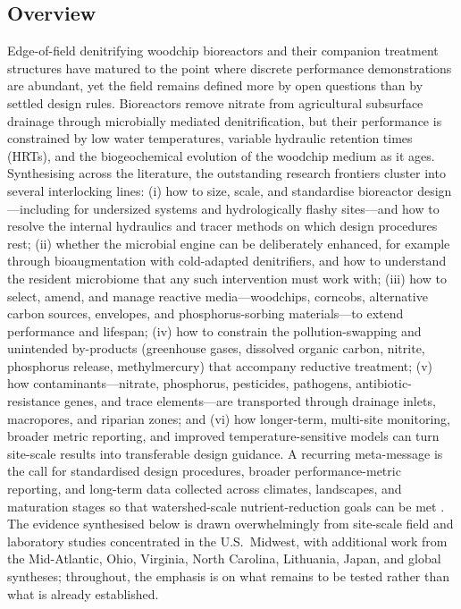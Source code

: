 \subsection{Overview}
Edge-of-field denitrifying woodchip bioreactors and their companion treatment structures have matured to the point where discrete performance demonstrations are abundant, yet the field remains defined more by open questions than by settled design rules. Bioreactors remove nitrate from agricultural subsurface drainage through microbially mediated denitrification, but their performance is constrained by low water temperatures, variable hydraulic retention times (HRTs), and the biogeochemical evolution of the woodchip medium as it ages. Synthesising across the literature, the outstanding research frontiers cluster into several interlocking lines: (i) how to size, scale, and standardise bioreactor design---including for undersized systems and hydrologically flashy sites---and how to resolve the internal hydraulics and tracer methods on which design procedures rest; (ii) whether the microbial engine can be deliberately enhanced, for example through bioaugmentation with cold-adapted denitrifiers, and how to understand the resident microbiome that any such intervention must work with; (iii) how to select, amend, and manage reactive media---woodchips, corncobs, alternative carbon sources, envelopes, and phosphorus-sorbing materials---to extend performance and lifespan; (iv) how to constrain the pollution-swapping and unintended by-products (greenhouse gases, dissolved organic carbon, nitrite, phosphorus release, methylmercury) that accompany reductive treatment; (v) how contaminants---nitrate, phosphorus, pesticides, pathogens, antibiotic-resistance genes, and trace elements---are transported through drainage inlets, macropores, and riparian zones; and (vi) how longer-term, multi-site monitoring, broader metric reporting, and improved temperature-sensitive models can turn site-scale results into transferable design guidance. A recurring meta-message is the call for standardised design procedures, broader performance-metric reporting, and long-term data collected across climates, landscapes, and maturation stages so that watershed-scale nutrient-reduction goals can be met \parencite{Christianson2021,Maxwell2022,Bell2015}. The evidence synthesised below is drawn overwhelmingly from site-scale field and laboratory studies concentrated in the U.S.\ Midwest, with additional work from the Mid-Atlantic, Ohio, Virginia, North Carolina, Lithuania, Japan, and global syntheses; throughout, the emphasis is on what remains to be tested rather than what is already established.

